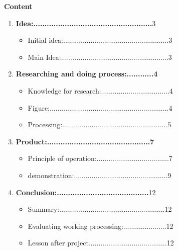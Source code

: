 \documentclass[10pt]{article}
\begin{document}
\begin{Large}
\begin{flushleft}
\textbf{Content}
\end{flushleft}
\begin{enumerate}
\item \textbf{Idea:.....................................................}3
	\begin{itemize}
	\item Initial idea:......................................................3
	\item Main Idea:.......................................................3
	\end{itemize}
\item \textbf{Researching and doing process:............4}
	\begin{itemize}
	 \item Knowledge for research:...................................4
	\item Figure:.............................................................4
	\item Processing:......................................................5
	\end{itemize}
\item \textbf{Product:..............................................7}
	\begin{itemize}
	\item Principle of operation:.....................................7
	\item demonstration:................................................9
	\end{itemize}
\item \textbf{Conclusion:.........................................}12
	\begin{itemize}
	\item Summary:......................................................12
	\item Evaluating working processing:......................12
	\item Lesson after project........................................12
	\end{itemize}
\end{enumerate}
\end{Large}

\newpage
\end{document}
